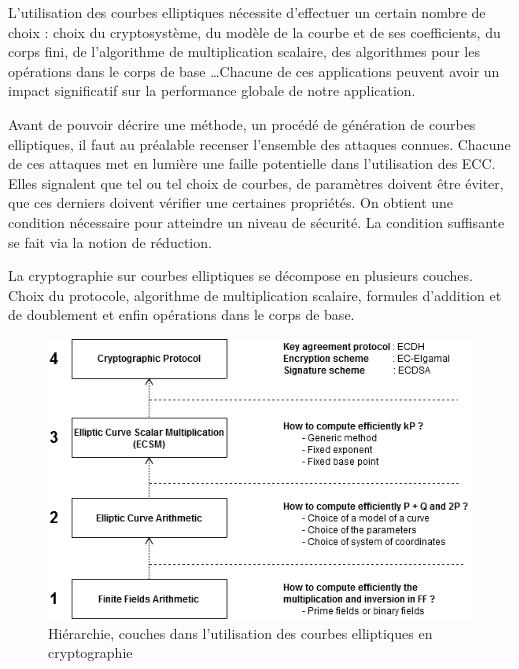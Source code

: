 L'utilisation des courbes elliptiques nécessite d'effectuer un certain nombre de choix : choix du cryptosystème, du modèle de la courbe et de ses coefficients, du corps fini, de l'algorithme de multiplication scalaire, des algorithmes pour les opérations dans le corps de base \ldots Chacune de ces applications peuvent avoir un impact significatif sur la performance globale de notre application.

Avant de pouvoir décrire une méthode, un procédé de génération de courbes elliptiques, il faut au préalable recenser l'ensemble des attaques connues. Chacune de ces attaques met en lumière une faille potentielle dans l'utilisation des ECC. Elles signalent que tel ou tel choix de courbes, de paramètres doivent être éviter, que ces derniers doivent vérifier une certaines propriétés. On obtient une condition nécessaire pour atteindre un niveau de sécurité. La condition suffisante se fait via la notion de réduction.

La cryptographie sur courbes elliptiques se décompose en plusieurs couches. Choix du protocole, algorithme de multiplication scalaire, formules d'addition et de doublement et enfin opérations dans le corps de base. 

\begin{figure}[h]
    \centering
    \includegraphics[scale=0.7]{images/ECC_level.png}
    \caption{Hiérarchie, couches dans l'utilisation des courbes elliptiques en cryptographie}
    \label{fig:my_label}
\end{figure}
\FloatBarrier

